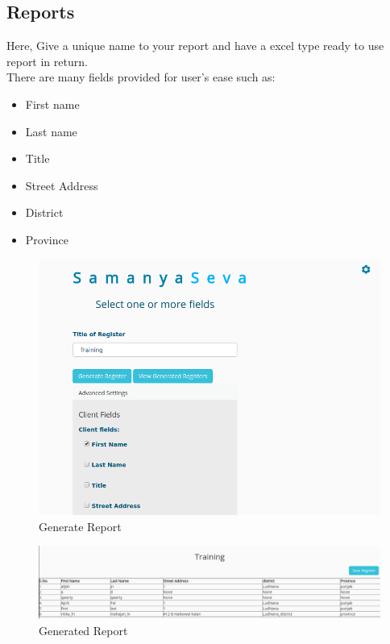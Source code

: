 \subsection{Reports}
Here, Give a unique name to your report and have a excel type ready to use report in return.\\
There are many fields provided for user's ease such as:
\begin{itemize}
	\item First name
	\item Last name
	\item Title
	\item Street Address
	\item District
	\item Province
\end{itemize}
\begin{figure}[h!]
\centering \includegraphics[scale=0.4]{input/images/gen1.png}
\caption{Generate Report}
\label{fig:UI1}
\end{figure}

\begin{figure}[h!]
\centering \includegraphics[scale=0.3]{input/images/gen2.png}
\caption{Generated Report}
\label{fig:UI1}
\end{figure}
\newpage
